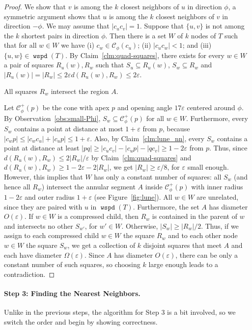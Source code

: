 \documentclass[11pt]{paper}
\newcommand {\eps} {\varepsilon}
\DeclareMathOperator {\wspd}{\texttt{wspd}}
\begin{document}
\begin {proof}
We show that $v$ is among the $k$ closest neighbors
of $u$ in direction $\phi$, a symmetric argument shows that $u$
is among the $k$ closest neighbors of $v$ in direction $-\phi$.
We may assume that  $|c_uc_v| =1$.
Suppose that $\{u,v\}$ is not among the $k$ shortest pairs
in direction $\phi$.
Then there is a set $W$ of $k$ nodes
of $T$ such that for all $w \in W$ we have
(i) $c_w \in \mathcal{C}_\phi(c_u)$;
(ii) $|c_uc_w| < 1$; and
(iii) $\{u,w\} \in \wspd(T)$.
By Claim~\ref{clm:quad-squares}, there exists for every
$w \in W$ a pair of squares $R_u(w), R_w$ such that
$S_u \subseteq R_u(w)$, $S_w \subseteq R_w$ and
$|R_u(w)| = |R_w| \leq 2\eps d(R_u(w), R_w) \leq 2\eps$.

 {All squares $R_w$ intersect the region $A$.}


Let $\mathcal{C}^+_{\phi}(p)$ be the cone with apex $p$ and opening angle
$17\eps$ centered around $\phi$. By Observation~\ref{obs:small-Phi},
$S_w \subseteq \mathcal{C}^+_{\phi}(p)$ for all $w \in W$.
Furthermore, every $S_w$ contains a point at distance at most $1+\eps$ from
$p$, because $|c_wp| \leq |c_wc_u| + |c_up| \leq 1+ \eps$.
Also, by Claim~\ref{clm:lune_nn}, every $S_w$ contains a point
at distance at least $|pq| \geq |c_u c_v| - |c_u p| - |q c_v| \geq 1-2\eps$
from $p$. Thus, since $d(R_u(w), R_w) \leq 2|R_w|/\eps$ 
by Claim~\ref {clm:quad-squares} and
$d(R_u(w), R_w) \geq 1 - 2\eps -2|R_w|$, we get $|R_w| \geq \eps/8$,
for $\eps$ small enough. However, this implies that
$W$ has only a constant number of squares:
all $S_w$ (and hence all $R_w$)
intersect the annular segment $A$  inside
$\mathcal{C}^+_{\phi}(p)$ with inner radius $1-2\eps$ and outer radius
$1+\eps$ (see Figure~\ref{fig:lune}).
All $w \in W$ are unrelated, since they are paired with
$u$ in $\wspd(T)$. Furthermore, the set $A$ has diameter $O(\eps)$.
If $w \in W$ is a compressed child, then $R_w$ is contained in the
parent of $w$ and intersects no
other $S_{w'}$, for $w' \in W$. Otherwise, 
$|S_w| \geq |R_w|/2$. Thus, if we assign to each compressed child
$w \in W$ the square $R_w$ and to each other node $w \in W$ the square
$S_w$, we get a collection of $k$ disjoint squares that
meet $A$ and each have diameter $\Omega(\eps)$. 
Since $A$ has diameter $O(\eps)$, 
there can be only a constant number of such
squares, so
choosing $k$ large enough leads to a contradiction.
\end{proof}

\paragraph{Step 3: Finding the Nearest Neighbors.}
Unlike in the previous steps, the algorithm for Step 3 is a bit
involved, so we switch the order and begin by
showing correctness.
\end{document}
